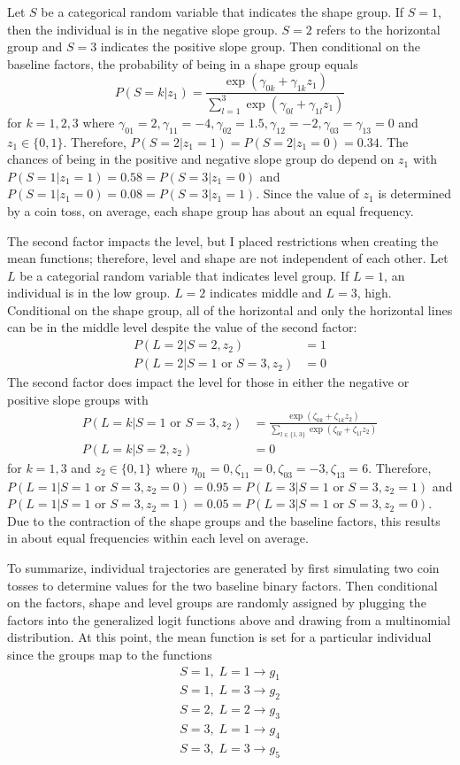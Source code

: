 \documentclass[12pt]{article}
\begin{document}
Let $S$ be a categorical random variable that indicates the shape group. If $S=1$, then the individual is in the negative slope group. $S=2$ refers to the horizontal group and $S=3$ indicates the positive slope group. Then conditional on the baseline factors, the probability of being in a shape group equals
$$P(S=k |z_{1}) = \frac{\exp(\gamma_{0k}+\gamma_{1k}z_{1})}{\sum^{3}_{l=1} \exp(\gamma_{0l}+\gamma_{1l}z_{1})}$$
for $k=1,2,3$ where $\gamma_{01}=2,\gamma_{11} = -4,\gamma_{02}=1.5,\gamma_{12}=-2,\gamma_{03}=\gamma_{13} = 0$ and $z_{1}\in\{0,1\}$. Therefore, $P(S=2|z_{1}=1) = P(S=2|z_{1}=0) = 0.34$. The chances of being in the positive and negative slope group do depend on $z_{1}$ with $P(S=1|z_{1}=1) = 0.58 = P(S=3|z_{1}=0)$ and $P(S=1|z_{1}=0) = 0.08 = P(S=3|z_{1}=1)$. Since the value of $z_{1}$ is determined by a coin toss, on average, each shape group has about an equal  frequency. 

The second factor impacts the level, but I placed restrictions when creating the mean functions; therefore, level and shape are not independent of each other. Let $L$ be a categorial random variable that indicates level group. If $L=1$, an individual is in the low group. $L=2$ indicates middle and $L=3$, high. Conditional on the shape group, all of the horizontal and only the horizontal lines can be in the middle level despite the value of the second factor:
\begin{align*}
P(L=2|S=2, z_{2}) & = 1\\
P(L=2|S=1 \text{ or } S=3, z_{2}) & = 0
\end{align*}
The second factor does impact the level for those in either the negative or positive slope groups with
\begin{align*}
P(L=k|S=1 \text{ or } S=3,z_{2}) & = \frac{\exp(\zeta_{0k}+\zeta_{1k} z_{2})}{\sum_{l\in\{1,3\} }\exp(\zeta_{0l}+\zeta_{1l}z_{2})}\\
P(L=k|S=2,z_{2}) & =0
\end{align*}
for $k=1,3$ and $z_{2}\in\{0,1\}$ where $\eta_{01}=0,\zeta_{11}=0,\zeta_{03}=-3,\zeta_{13}=6$. Therefore, $P(L=1|S=1 \text{ or }S=3,z_{2}=0) = 0.95 = P(L=3|S=1 \text{ or }S=3,z_{2}=1)$ and $P(L=1|S=1 \text{ or }S=3,z_{2}=1) = 0.05 = P(L=3|S=1 \text{ or }S=3,z_{2}=0)$.  Due to the contraction of the shape groups and the baseline factors, this results in about equal frequencies within each level on average.

To summarize, individual trajectories are generated by first simulating two coin tosses to determine values for the two baseline binary factors. Then conditional on the factors, shape and level groups are randomly assigned by plugging the factors into the generalized logit functions above and drawing from a multinomial distribution. At this point, the mean function is set for a particular individual since the groups map to the functions
\begin{align*}
S = 1,\; L=1 \rightarrow g_{1}\\
S = 1,\; L=3 \rightarrow g_{2}\\
S = 2,\; L=2 \rightarrow g_{3}\\
S = 3,\; L=1 \rightarrow g_{4}\\
S = 3,\; L=3 \rightarrow g_{5}
\end{align*}
\end{document}
